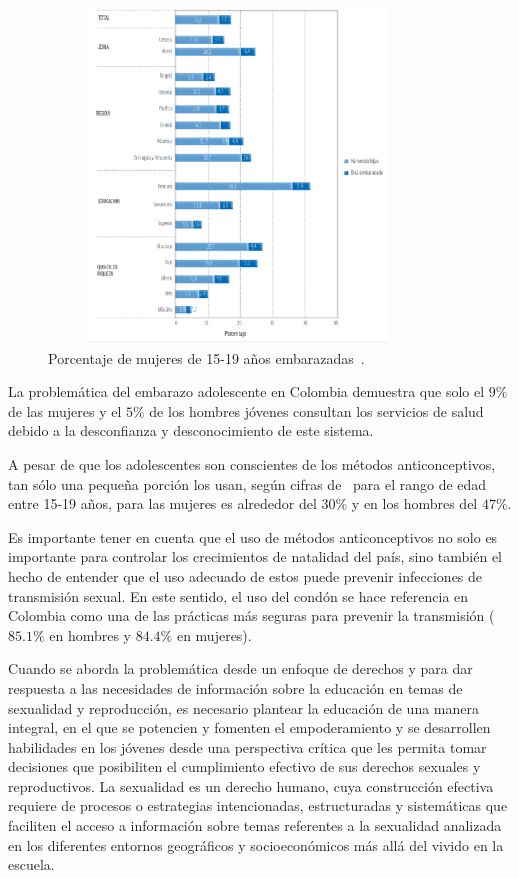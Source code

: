 \documentclass[a4paper]{article}
\begin{document}
\begin{figure}[t]
\centering
\includegraphics[width=0.9\textwidth,height=3.5in]{datos.eps}
\caption{Porcentaje de mujeres de 15-19 años embarazadas~\citep{Pro2015}.}
\label{fig:ends}
\end{figure}

La problemática del embarazo adolescente en Colombia demuestra que solo el $9\%$ de las mujeres y el $5\%$ de los hombres jóvenes consultan los servicios de salud debido a la desconfianza y desconocimiento de este sistema. 

A pesar de que los adolescentes son conscientes de los métodos anticonceptivos, tan sólo una pequeña porción los usan, según cifras de~\citep{Pro2015II} para el rango de edad entre 15-19 años, para las mujeres es alrededor del $30\%$ y en los hombres del $47\%$.

Es importante tener en cuenta que el uso de métodos anticonceptivos no solo es importante para controlar los crecimientos de natalidad del país, sino también el hecho de entender que el uso adecuado de estos puede prevenir infecciones de transmisión sexual. En este sentido, el uso del condón se hace referencia en Colombia como una de las prácticas más seguras para prevenir la transmisión ($85.1\%$ en hombres y $84.4\%$ en mujeres).

Cuando se aborda la problemática desde un enfoque de derechos y para dar respuesta a las necesidades de información sobre la educación en temas de sexualidad y reproducción, es necesario plantear la educación de una manera integral, en el que se potencien y fomenten el empoderamiento y se desarrollen habilidades en los jóvenes desde una perspectiva crítica que les permita tomar decisiones que posibiliten el cumplimiento efectivo de sus derechos sexuales y reproductivos. La sexualidad es un derecho humano, cuya construcción efectiva requiere de procesos o estrategias intencionadas, estructuradas y sistemáticas que faciliten el acceso a información sobre temas referentes a la sexualidad analizada en los diferentes entornos geográficos y socioeconómicos más allá del vivido en la escuela.
\end{document}
